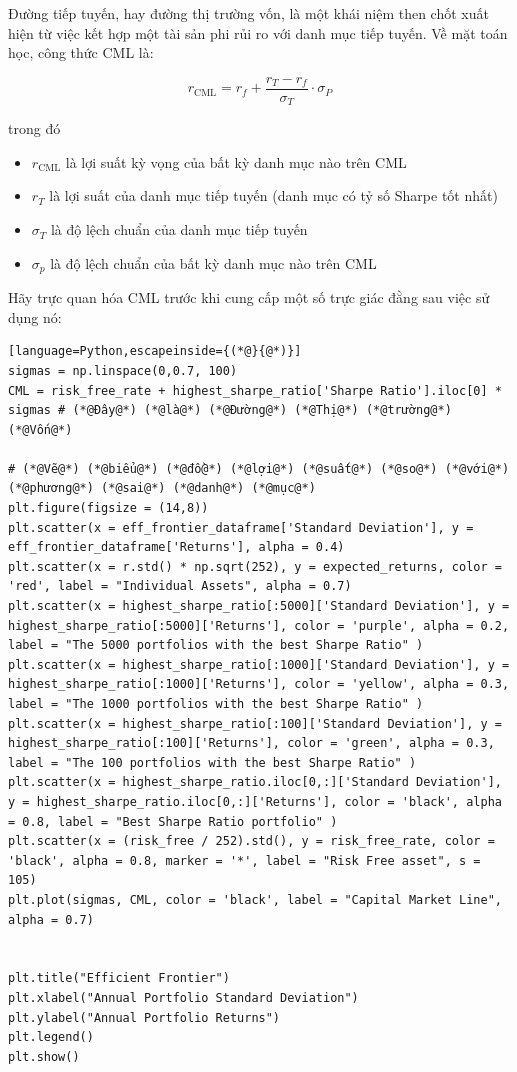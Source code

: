 Đường tiếp tuyến, hay đường thị trường vốn, là một khái niệm then chốt xuất hiện từ việc kết hợp một tài sản phi rủi ro với danh mục tiếp tuyến. Về mặt toán học, công thức CML là:

$$
r_{\text{CML}} = r_{f} + \frac{r_{T} - r_{f}}{\sigma_{T}} \cdot \sigma_{P}
$$

trong đó
\begin{itemize}
  \item $r_{\text{CML}}$ là lợi suất kỳ vọng của bất kỳ danh mục nào trên CML
  \item $r_{T}$ là lợi suất của danh mục tiếp tuyến (danh mục có tỷ số Sharpe tốt nhất)
  \item $\sigma_{T}$ là độ lệch chuẩn của danh mục tiếp tuyến
  \item $\sigma_{p}$ là độ lệch chuẩn của bất kỳ danh mục nào trên CML
\end{itemize}

Hãy trực quan hóa CML trước khi cung cấp một số trực giác đằng sau việc sử dụng nó:

\begin{lstlisting}[language=Python,escapeinside={(*@}{@*)}]
sigmas = np.linspace(0,0.7, 100)
CML = risk_free_rate + highest_sharpe_ratio['Sharpe Ratio'].iloc[0] * sigmas # (*@Đây@*) (*@là@*) (*@Đường@*) (*@Thị@*) (*@trường@*) (*@Vốn@*)

# (*@Vẽ@*) (*@biểu@*) (*@đồ@*) (*@lợi@*) (*@suất@*) (*@so@*) (*@với@*) (*@phương@*) (*@sai@*) (*@danh@*) (*@mục@*)
plt.figure(figsize = (14,8))
plt.scatter(x = eff_frontier_dataframe['Standard Deviation'], y = eff_frontier_dataframe['Returns'], alpha = 0.4)
plt.scatter(x = r.std() * np.sqrt(252), y = expected_returns, color = 'red', label = "Individual Assets", alpha = 0.7)
plt.scatter(x = highest_sharpe_ratio[:5000]['Standard Deviation'], y = highest_sharpe_ratio[:5000]['Returns'], color = 'purple', alpha = 0.2, label = "The 5000 portfolios with the best Sharpe Ratio" )
plt.scatter(x = highest_sharpe_ratio[:1000]['Standard Deviation'], y = highest_sharpe_ratio[:1000]['Returns'], color = 'yellow', alpha = 0.3, label = "The 1000 portfolios with the best Sharpe Ratio" )
plt.scatter(x = highest_sharpe_ratio[:100]['Standard Deviation'], y = highest_sharpe_ratio[:100]['Returns'], color = 'green', alpha = 0.3, label = "The 100 portfolios with the best Sharpe Ratio" )
plt.scatter(x = highest_sharpe_ratio.iloc[0,:]['Standard Deviation'], y = highest_sharpe_ratio.iloc[0,:]['Returns'], color = 'black', alpha = 0.8, label = "Best Sharpe Ratio portfolio" )
plt.scatter(x = (risk_free / 252).std(), y = risk_free_rate, color = 'black', alpha = 0.8, marker = '*', label = "Risk Free asset", s = 105)
plt.plot(sigmas, CML, color = 'black', label = "Capital Market Line", alpha = 0.7)


plt.title("Efficient Frontier")
plt.xlabel("Annual Portfolio Standard Deviation")
plt.ylabel("Annual Portfolio Returns")
plt.legend()
plt.show()
\end{lstlisting}

